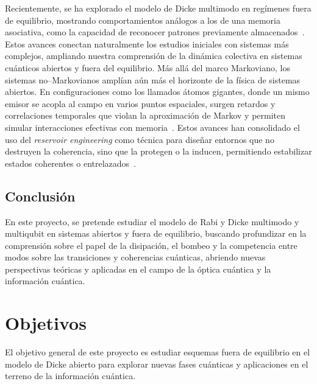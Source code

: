 \documentclass[onecolumn,notitlepage,letterpaper,aps,pra,12pt]{article}
\numberwithin{equation}{section}
\begin{document}
Recientemente, se ha explorado el modelo de Dicke multimodo en regímenes fuera de equilibrio, mostrando comportamientos análogos a los de una memoria asociativa, como la capacidad de reconocer patrones previamente almacenados~\cite{fiorelli2020}. Estos avances conectan naturalmente los estudios iniciales con sistemas más complejos, ampliando nuestra comprensión de la dinámica colectiva en sistemas cuánticos abiertos y fuera del equilibrio.
Más allá del marco Markoviano, los sistemas no–Markovianos amplían aún más el horizonte de la física de sistemas abiertos. En configuraciones como los llamados átomos gigantes, donde un mismo emisor se acopla al campo en varios puntos espaciales, surgen retardos y correlaciones temporales que violan la aproximación de Markov y permiten simular interacciones efectivas con memoria~\cite{kockum2019,guo2020}. Estos avances han consolidado el uso del \textit{reservoir engineering} como técnica para diseñar entornos que no destruyen la coherencia, sino que la protegen o la inducen, permitiendo estabilizar estados coherentes o entrelazados~\cite{poyatos1996,Diehl2008}.



\subsection{Conclusión}

En este proyecto, se pretende estudiar el modelo de Rabi y Dicke  multimodo y multiqubit en sistemas abiertos y fuera de equilibrio, buscando profundizar en la comprensión sobre el papel de la disipación, el bombeo y la competencia entre modos sobre las transiciones y coherencias cuánticas, abriendo nuevas perspectivas teóricas y aplicadas en el campo de la óptica cuántica y la información cuántica. 

\section{Objetivos}

El objetivo general de este proyecto es estudiar esquemas fuera de equilibrio en el modelo de Dicke abierto para explorar nuevas fases cuánticas y aplicaciones en el terreno de la información cuántica. 
\end{document}
